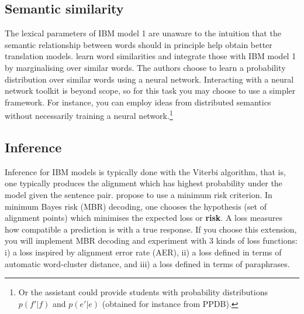 \subsection*{Semantic similarity}


The lexical parameters of IBM model 1 are unaware to the intuition that the semantic relationship between words should in principle help obtain better translation models.
\cite{Songyot+2014:WAWS} learn word similarities and integrate those with IBM model 1 by marginalising over similar words.
The authors choose to learn a probability distribution over similar words using a neural network.
Interacting with a neural network toolkit is beyond scope, so for this task you may choose to use a simpler framework. 
For instance, you can employ ideas from distributed semantics without necessarily training a neural network.\footnote{Or the assistant could provide students with probability distributions $p(f'|f)$ and $p(e'|e)$ (obtained for instance from PPDB).}

\subsection*{Inference}

Inference for IBM models is typically done with the Viterbi algorithm, that is, one typically produces the alignment which has highest probability under the model given the sentence pair.
\citet{Kumar+2002:MBRWA} propose to use a minimum risk criterion. 
In minimum Bayes risk (MBR) decoding, one chooses the hypothesis (set of alignment points) which minimises the expected loss or {\bf risk}.
A loss measures how compatible a prediction is with a true response.
If you choose this extension, you will implement MBR decoding and experiment with 3 kinds of loss functions: i) a loss inspired by alignment error rate (AER), ii) a loss defined in terms of automatic word-cluster distance, and iii) a loss defined in terms of paraphrases. 
